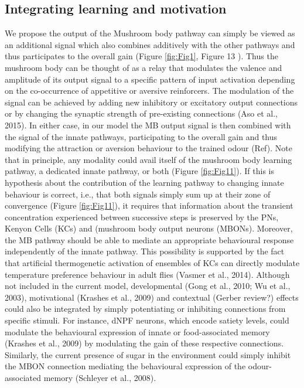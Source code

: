 \documentclass[10pt,a4paper]{article}
\begin{document}
\subsection{Integrating learning and motivation}
We propose the output of the Mushroom body pathway \citep{gerber2004engram} can simply be viewed as an additional signal which also combines additively with the other pathways and thus participates to the overall gain (Figure \ref{fig:Fig1}, Figure 13 ). Thus the mushroom body can be thought of as a relay that modulates the valence and amplitude of its output signal to a specific pattern of input activation depending on the co-occurrence of appetitive or aversive reinforcers. The modulation of the signal can be achieved by adding new inhibitory or excitatory output connections or by changing the synaptic strength of pre-existing connections (Aso et al., 2015). In either case, in our model the MB output signal is then combined with the signal of the innate pathways, participating to the overall gain and thus modifying the attraction or aversion behaviour to the trained odour (Ref). Note that in principle, any modality could avail itself of the mushroom body learning pathway, a dedicated innate pathway, or both (Figure \ref{fig:Fig11}). 
If this is hypothesis about the contribution of the learning pathway to changing innate behaviour is correct, i.e., that both signals simply sum up at their zone of convergence (Figure \ref{fig:Fig11}), it requires that information about the transient concentration experienced between successive steps is preserved by the PNs, Kenyon Cells (KCs) and (mushroom body output neurons (MBONs). Moreover, the MB pathway should be able to mediate an appropriate behavioural response independently of the innate pathway. This possibility is supported by the fact that artificial thermogenetic activation of ensembles of KCs can directly modulate temperature preference behaviour in adult flies (Vasmer et al., 2014). 
Although not included in the current model, developmental (Gong et al., 2010; Wu et al., 2003), motivational (Krashes et al., 2009) and contextual (Gerber review?) effects could also be integrated by simply potentiating or inhibiting connections from specific stimuli. For instance, dNPF neurons, which encode satiety levels, could modulate the behavioural expression of innate or food-associated memory (Krashes et al., 2009) by modulating the gain of these respective connections. Similarly, the current presence of sugar in the environment could simply inhibit the MBON connection mediating the behavioural expression of the odour-associated memory (Schleyer et al., 2008).
\end{document}
